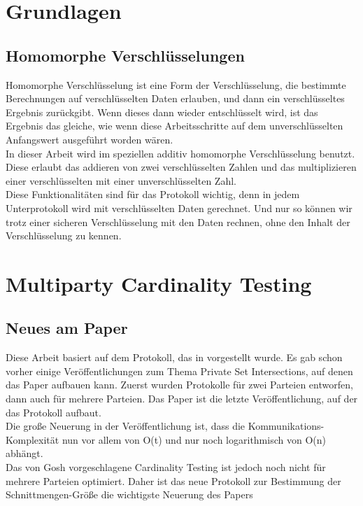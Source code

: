 \documentclass[a4paper,10pt]{scrartcl}
\begin{document}
\section{Grundlagen}

\subsection{Homomorphe Verschlüsselungen}
Homomorphe Verschlüsselung ist eine Form der Verschlüsselung, die bestimmte Berechnungen auf verschlüsselten Daten erlauben, und dann ein verschlüsseltes Ergebnis zurückgibt. Wenn dieses dann wieder entschlüsselt wird, ist das Ergebnis das gleiche, wie wenn diese Arbeitsschritte auf dem unverschlüsselten Anfangswert ausgeführt worden wären. \cite{Yi2014} \\
In dieser Arbeit wird im speziellen additiv homomorphe Verschlüsselung benutzt. Diese  erlaubt das addieren von zwei verschlüsselten Zahlen und das multiplizieren einer verschlüsselten mit einer unverschlüsselten Zahl.\\
Diese Funktionalitäten sind für das Protokoll wichtig, denn in jedem Unterprotokoll wird mit verschlüsselten Daten gerechnet. Und nur so können wir trotz einer sicheren Verschlüsselung mit den Daten rechnen, ohne den Inhalt der Verschlüsselung zu kennen.




\section{Multiparty Cardinality Testing}

\subsection{Neues am Paper}
Diese Arbeit basiert auf dem Protokoll, das in \cite{Doettling2021} vorgestellt wurde. Es gab schon vorher einige Veröffentlichungen zum Thema Private Set Intersections, auf denen das Paper aufbauen kann. Zuerst wurden Protokolle für zwei Parteien entworfen, dann auch für mehrere Parteien. Das Paper
\cite{Ghosh2019} ist die letzte Veröffentlichung, auf der das Protokoll aufbaut.\\
Die große Neuerung in der Veröffentlichung \cite{Ghosh2019} ist, dass die Kommunikations-Komplexität nun vor allem von O(t) und nur noch logarithmisch von O(n) abhängt. \cite{Ghosh2019}\\
Das von Gosh vorgeschlagene Cardinality Testing ist jedoch noch nicht  für mehrere Parteien optimiert. Daher ist das neue Protokoll zur Bestimmung der Schnittmengen-Größe die wichtigste Neuerung des Papers \cite{Doettling2021}
\end{document}
